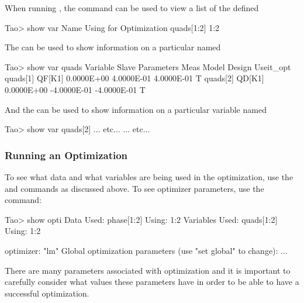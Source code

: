 \documentclass{hitec}     %
\begin{document}
{When running \tao, the  command can be used to view a list of the  defined
\begin{code}
Tao> show var
       Name                                      Using for Optimization
    quads[1:2]                                   1:2
\end{code}
The  can be used to show information on a particular  named 
\begin{code}
Tao> show var quads
  Variable      Slave Parameters   Meas         Model        Design  Useit_opt
  quads[1]      QF[K1]         0.0000E+00    4.0000E-01    4.0000E-01       T
  quads[2]      QD[K1]         0.0000E+00   -4.0000E-01   -4.0000E-01       T
\end{code}
And the  can be used to show information on a particular variable named 
\begin{code}
Tao> show var quads[2]
... etc...
... etc...
\end{code}

\subsubsection{Running an Optimization}

To see what data and what variables are being used in the optimization, use the  and
 commands as discussed above. To see optimizer parameters, use the  command:
\begin{code}
Tao> show opti
Data Used:
  phase[1:2]                                     Using: 1:2
Variables Used:
  quads[1:2]                                     Using: 1:2

optimizer:        "lm"
Global optimization parameters (use "set global" to change):
  ...
\end{code}
There are many parameters associated with optimization and it is important to carefully consider
what values these parameters have in order to be able to have a successful optimization.

}
\end{document}
